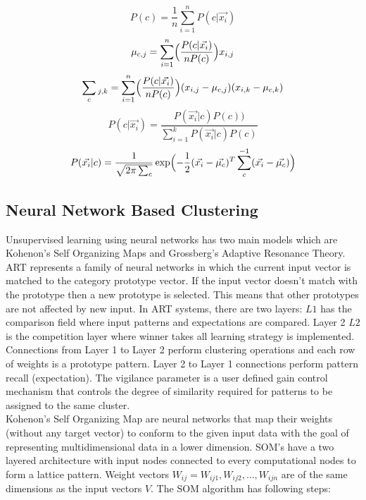 \documentclass[conference]{IEEEtran}
\begin{document}
\begin{equation}
P(c)= \frac{1}{n} \sum_{i=1}^{n} P(c\vert\vec{x_i})
\end{equation}
\begin{equation}
\mu_{c,j} = \sum_{i=1}^{n} \Bigl(\frac{P(c\vert\vec{x_i})}{nP(c)}\Bigr)x_{i,j}
\end{equation}
\begin{equation}
\sum_{c}{\mathstrut}_{j,k} = \sum_{i=1}^{n}\Bigl(\frac{P(c\vert\vec{x_i})}{nP(c)}\Bigr)(x_{i,j} - \mu_{c,j})(x_{i,k} - \mu_{c,k})
\end{equation}
\begin{equation}
 P(c\vert\vec{x_i}) = \frac{P(\vec{x_i}\vert c)P(c))}{\sum_{i=1}^{k}P(\vec{x_i}\vert c)P(c)}
 \end{equation}
 \begin{equation}
P(\vec{x_i}|c) = \frac{1}{\sqrt{2\pi\sum_{c}}} \exp\Bigl(- \frac{1}{2}(\vec{x_i} - \vec{\mu_c})^T \sum_{c}^{-1}(\vec{x_i} - \vec{\mu_c})\Bigr)
\end{equation}
\vspace{10px}

\subsection{Neural Network Based Clustering}
Unsupervised learning using neural networks has two main models which are Kohenon's Self Organizing Maps and Grossberg's Adaptive Resonance Theory. ART represents a family of neural networks in which the current input vector is matched to the category prototype vector. If the input vector doesn't match with the prototype then a new prototype is selected. This means that other prototypes are not affected by new input. In ART systems, there are two layers: $L1$ has the comparison field where input patterns and expectations are compared. Layer 2 $L2$ is the competition layer where winner takes all learning strategy is implemented. Connections from Layer 1 to Layer 2 perform clustering operations and each row of weights is a prototype pattern. Layer 2 to Layer 1 connections perform pattern recall (expectation). The vigilance parameter is a user defined gain control mechanism that controls the degree of similarity required for patterns to be assigned to the same cluster. \\

Kohenon's Self Organizing Map are neural networks that map their weights (without any target vector) to conform to the given input data with the goal of representing multidimensional data in a lower dimension. SOM's have a two layered architecture with input nodes connected to every computational nodes to form a lattice pattern. Weight vectors $W_{ij} = W_{ij1}, W_{ij2}, ... , W_{ijn}$ are of the same dimensions as the input vectors $V$. The SOM algorithm has following steps:\\
\end{document}
